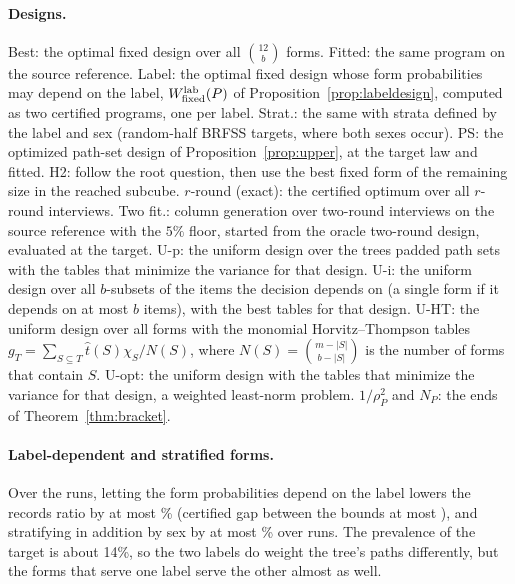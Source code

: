 \paragraph{Designs.}
Best: the optimal fixed design over all $\binom{12}b$ forms. Fitted: the same program on the source reference. Label: the optimal fixed design whose form probabilities may depend on the label, $W^{\rm lab}_{\rm fixed}(P)$ of Proposition~\ref{prop:labeldesign}, computed as two certified programs, one per label. Strat.: the same with strata defined by the label and sex (random-half BRFSS targets, where both sexes occur). PS: the optimized path-set design of Proposition~\ref{prop:upper}, at the target law and fitted. H2: follow the root question, then use the best fixed form of the remaining size in the reached subcube. $r$-round (exact): the certified optimum over all $r$-round interviews. Two fit.: column generation over two-round interviews on the source reference with the $5\%$ floor, started from the oracle two-round design, evaluated at the target. U-p: the uniform design over the tree\textquotesingle s padded path sets with the tables that minimize the variance for that design. U-i: the uniform design over all $b$-subsets of the items the decision depends on (a single form if it depends on at most $b$ items), with the best tables for that design. U-HT: the uniform design over all forms with the monomial Horvitz--Thompson tables $g_T=\sum_{S\subseteq T}\widehat t(S)\chi_S/N(S)$, where $N(S)=\binom{m-|S|}{b-|S|}$ is the number of forms that contain $S$. U-opt: the uniform design with the tables that minimize the variance for that design, a weighted least-norm problem. $1/\rho_P^2$ and $N_P$: the ends of Theorem~\ref{thm:bracket}.




\paragraph{Label-dependent and stratified forms.}
Over the \nLabelN{} runs, letting the form probabilities depend on the label lowers the records ratio by at most \nLabelMax\% (certified gap between the bounds at most \nLabelCert), and stratifying in addition by sex by at most \nStratMax\% over \nStratN{} runs. The prevalence of the target is about 14\%, so the two labels do weight the tree's paths differently, but the forms that serve one label serve the other almost as well.

